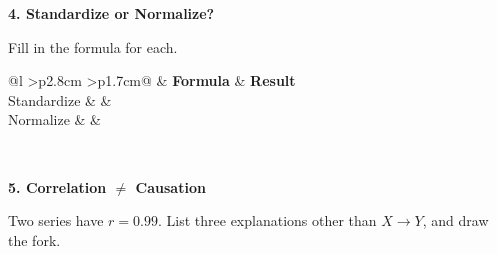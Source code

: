 \documentclass[11pt]{article}
\newcommand{\blankspace}[1]{%
  \vspace{0.3em}
  \begin{minipage}[t][#1][t]{\linewidth}
  \end{minipage}
  \vspace{0.3em}
}
\newcommand{\guidedopen}[4]{%
  \noindent\textbf{#1}\\[0.18em]
  \noindent
  \begin{minipage}[t]{0.485\textwidth}
    #2
    \blankspace{#3}
  \end{minipage}
  \hfill
  \begin{minipage}[t]{0.485\textwidth}
    \blankspace{#4}
  \end{minipage}
  \\[0.4em]
}
\begin{document}
\vfill

\newpage

\guidedopen{4. Standardize or Normalize?}{
Fill in the formula for each.

\vspace{0.4em}

{\small\renewcommand{\arraystretch}{2.2}%
\noindent\begin{tabular}{@{}l >{\centering\arraybackslash}p{2.8cm} >{\centering\arraybackslash}p{1.7cm}@{}}
\toprule
 & \textbf{Formula} & \textbf{Result} \\
\midrule
Standardize & & \\
Normalize & & \\
\bottomrule
\end{tabular}}
}{1.2cm}{4.6cm}

\vspace{1.5em}

\guidedopen{5. Correlation $\neq$ Causation}{
Two series have ${r = 0.99}$. List three explanations other than $X \to Y$, and draw the fork.
}{4.4cm}{5.3cm}
\end{document}
